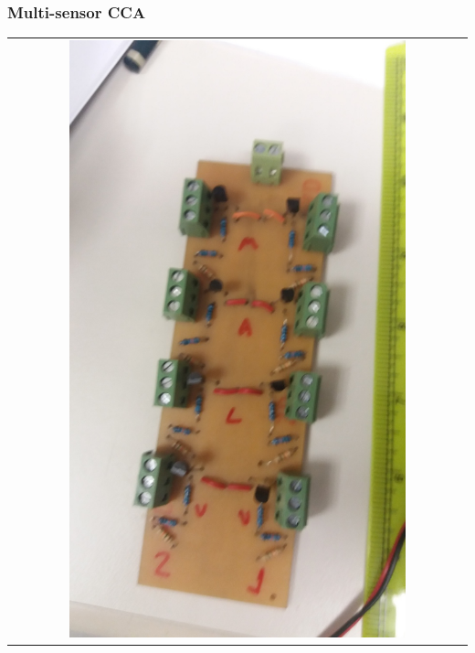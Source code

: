 \documentclass[12pt,handout]{beamer}
\begin{document}
\begin{frame}
  \frametitle{Multi-sensor CCA}
  \centering
  \begin{tabular}{c}
    \includegraphics[width=0.75\textwidth]{20181106_192208.jpg}\\

\end{tabular}
\end{frame}
\end{document}
